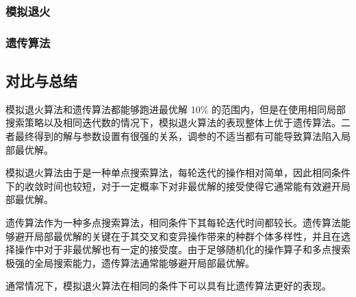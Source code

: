 \subsubsection{模拟退火}


\subsubsection{遗传算法}


\subsection{对比与总结}

模拟退火算法和遗传算法都能够跑进最优解 10\% 的范围内，但是在使用相同局部搜索策略以及相同迭代数的情况下，模拟退火算法的表现整体上优于遗传算法。二者最终得到的解与参数设置有很强的关系，调参的不适当都有可能导致算法陷入局部最优解。

模拟退火算法由于是一种单点搜索算法，每轮迭代的操作相对简单，因此相同条件下的收敛时间也较短，对于一定概率下对非最优解的接受使得它通常能有效避开局部最优解。

遗传算法作为一种多点搜索算法，相同条件下其每轮迭代时间都较长。遗传算法能够避开局部最优解的关键在于其交叉和变异操作带来的种群个体多样性，并且在选择操作中对于非最优解也有一定的接受度。由于足够随机化的操作算子和多点搜索极强的全局搜索能力，遗传算法通常能够避开局部最优解。

通常情况下，模拟退火算法在相同的条件下可以具有比遗传算法更好的表现。

